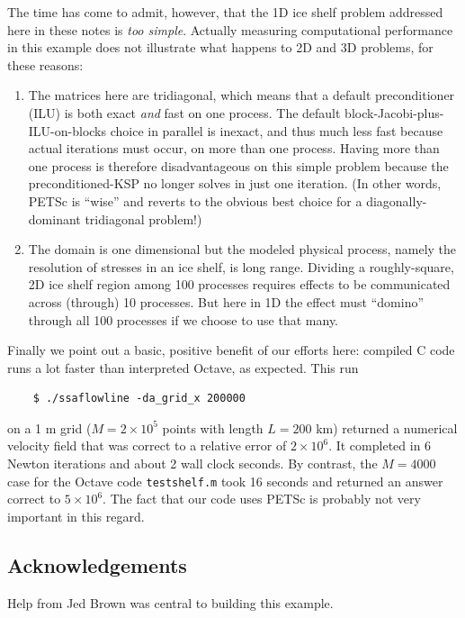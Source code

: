 \documentclass[11pt,final,reqno]{amsart}
\begin{document}
The time has come to admit, however, that the 1D ice shelf problem addressed here in these notes is \emph{too simple}.  Actually measuring computational performance in this example does not illustrate what happens to 2D and 3D problems, for these reasons:\begin{enumerate}
\item The matrices here are tridiagonal, which means that a default preconditioner (ILU) is both exact \emph{and} fast on one process.  The default block-Jacobi-plus-ILU-on-blocks choice in parallel is inexact, and thus much less fast because actual iterations must occur, on more than one process.  Having more than one process is therefore disadvantageous on this simple problem because the preconditioned-KSP no longer solves in just one iteration.  (In other words, PETSc is ``wise'' and reverts to the obvious best choice for a diagonally-dominant tridiagonal problem!)
\item The domain is one dimensional but the modeled physical process, namely the resolution of stresses in an ice shelf, is long range.  Dividing a roughly-square, 2D ice shelf region among 100 processes requires effects to be communicated across (through) 10 processes.  But here in 1D the effect must ``domino'' through all 100 processes if we choose to use that many.
\end{enumerate}

Finally we point out a basic, positive benefit of our efforts here: compiled C code runs a lot faster than interpreted Octave, as expected.  This run
\begin{Verbatim}
    $ ./ssaflowline -da_grid_x 200000
\end{Verbatim}
on a 1 m grid ($M=2\times 10^5$ points with length $L=200$ km) returned a numerical velocity field that was correct to a relative error of $2\times 10^6$.  It completed in 6 Newton iterations and about 2 wall clock seconds.  By contrast, the $M=4000$ case for the Octave code \texttt{testshelf.m} took 16 seconds and returned an answer correct to $5 \times 10^6$.  The fact that our code uses PETSc is probably not very important in this regard.

\subsection*{Acknowledgements}  Help from Jed Brown was central to building this example.



\end{document}
